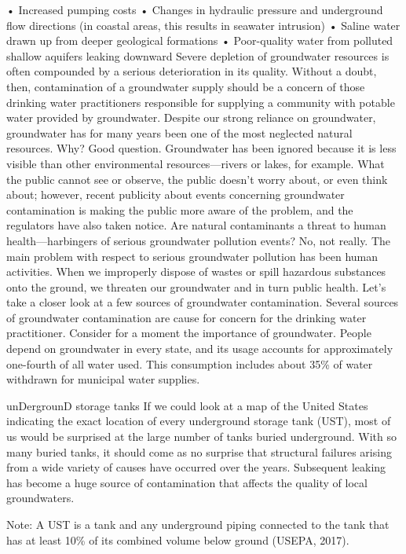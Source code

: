 \documentclass{article}
\begin{document}
• Increased pumping costs • Changes in hydraulic pressure and
underground flow directions (in coastal areas, this results in seawater
intrusion) • Saline water drawn up from deeper geological formations •
Poor-quality water from polluted shallow aquifers leaking downward
Severe depletion of groundwater resources is often compounded by a
serious deterioration in its quality. Without a doubt, then,
contamination of a groundwater supply should be a concern of those
drinking water practitioners responsible for supplying a community with
potable water provided by groundwater. Despite our strong reliance on
groundwater, groundwater has for many years been one of the most
neglected natural resources. Why? Good question. Groundwater has been
ignored because it is less visible than other environmental
resources---rivers or lakes, for example. What the public cannot see or
observe, the public doesn't worry about, or even think about; however,
recent publicity about events concerning groundwater contamination is
making the public more aware of the problem, and the regulators have
also taken notice. Are natural contaminants a threat to human
health---harbingers of serious groundwater pollution events? No, not
really. The main problem with respect to serious groundwater pollution
has been human activities. When we improperly dispose of wastes or spill
hazardous substances onto the ground, we threaten our groundwater and in
turn public health. Let's take a closer look at a few sources of
groundwater contamination. Several sources of groundwater contamination
are cause for concern for the drinking water practitioner. Consider for
a moment the importance of groundwater. People depend on groundwater in
every state, and its usage accounts for approximately one-fourth of all
water used. This consumption includes about 35\% of water withdrawn for
municipal water supplies.

unDergrounD storage tanks If we could look at a map of the United States
indicating the exact location of every underground storage tank (UST),
most of us would be surprised at the large number of tanks buried
underground. With so many buried tanks, it should come as no surprise
that structural failures arising from a wide variety of causes have
occurred over the years. Subsequent leaking has become a huge source of
contamination that affects the quality of local groundwaters.

Note: A UST is a tank and any underground piping connected to the tank
that has at least 10\% of its combined volume below ground (USEPA,
2017).
\end{document}
